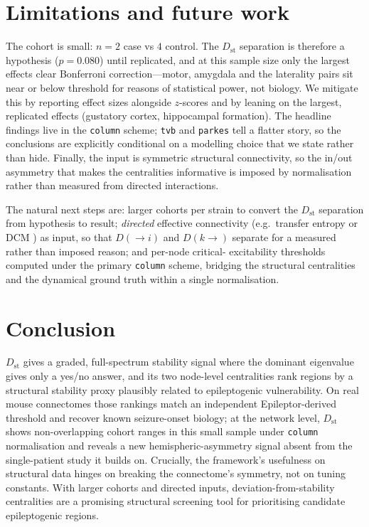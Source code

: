 \documentclass[11pt,a4paper]{article}
\newcommand{\Dst}{D_{\mathrm{st}}}
\newcommand{\Dto}{D(\!\to\! i)}
\newcommand{\Dfrom}{D(k\!\to\!)}
\begin{document}
\section{Limitations and future work}
\label{sec:limits}
The cohort is small: $n=2$ case vs $4$ control. The $\Dst$ separation is therefore a hypothesis
($p=0.080$) until replicated, and at this sample size only the largest effects clear Bonferroni
correction---motor, amygdala and the laterality pairs sit near or below threshold for reasons of
statistical power, not biology. We mitigate this by reporting effect sizes alongside $z$-scores and by
leaning on the largest, replicated effects (gustatory cortex, hippocampal formation). The headline
findings live in the \texttt{column} scheme; \texttt{tvb} and \texttt{parkes} tell a flatter story, so
the conclusions are explicitly conditional on a modelling choice that we state rather than hide.
Finally, the input is symmetric structural connectivity, so the in/out asymmetry that makes the
centralities informative is imposed by normalisation rather than measured from directed interactions.

The natural next steps are: larger cohorts per strain to convert the $\Dst$ separation from hypothesis
to result; \emph{directed} effective connectivity (e.g.\ transfer entropy \citep{vicente2011} or DCM \citep{friston2003}) as input, so that
$\Dto$ and $\Dfrom$ separate for a measured rather than imposed reason; and per-node critical-%
excitability thresholds computed under the primary \texttt{column} scheme, bridging the structural
centralities and the dynamical ground truth within a single normalisation.

\section{Conclusion}
$\Dst$ gives a graded, full-spectrum stability signal where the dominant eigenvalue gives only a
yes/no answer, and its two node-level centralities rank regions by a structural stability proxy
plausibly related to epileptogenic vulnerability. On real
mouse connectomes those rankings match an independent Epileptor-derived threshold and recover known
seizure-onset biology; at the network level, $\Dst$ shows non-overlapping cohort ranges in this small sample under \texttt{column} normalisation and
reveals a new hemispheric-asymmetry signal absent from the single-patient study it builds on.
Crucially, the framework's usefulness on structural data hinges on breaking the connectome's symmetry,
not on tuning constants. With larger cohorts and directed inputs, deviation-from-stability centralities
are a promising structural screening tool for prioritising candidate epileptogenic regions.
\end{document}

